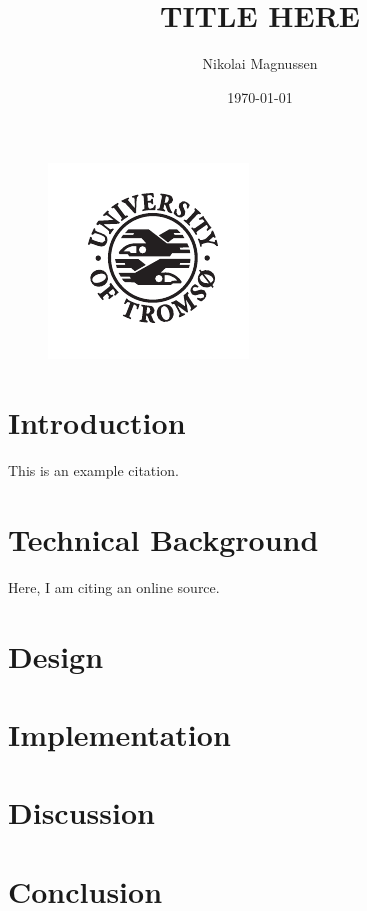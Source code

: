 \documentclass[12pt]{article}
\title{TITLE HERE}
\author{Nikolai Magnussen}
\date{\today}
\begin{document}
\begin{titlingpage}
	\maketitle
	\begin{figure}[hb]
		\centering
		\includegraphics[scale=3.4]{uit.pdf}
	\end{figure}
\end{titlingpage}

\section*{Introduction}
This is an example citation\cite{kake}.

\section*{Technical Background}
Here, I am citing an online source\cite{torsk}.

\section*{Design}

\section*{Implementation}

\section*{Discussion}

\section*{Conclusion}

\printbibliography
\end{document}
